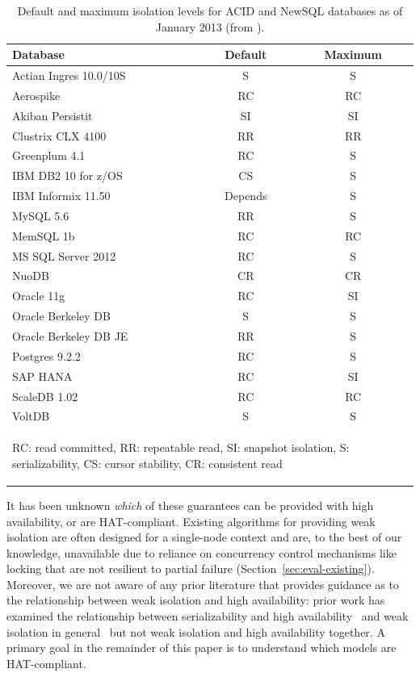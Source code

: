 \begin{table}
\begin{center}
\begin{small}
\begin{tabular}{|l|c|c|}
\hline
Database & Default & Maximum\\\hline
Actian Ingres 10.0/10S & S & S\\
Aerospike & RC & RC\\
Akiban Persistit & SI & SI\\
Clustrix CLX 4100 & RR & RR\\
Greenplum 4.1 & RC & S \\
IBM DB2 10 for z/OS & CS & S\\
IBM Informix 11.50 & Depends & S\\
MySQL 5.6 & RR & S \\
MemSQL 1b & RC & RC\\
MS SQL Server 2012 & RC & S \\
NuoDB & CR & CR\\
Oracle 11g & RC & SI\\
Oracle Berkeley DB & S & S\\
Oracle Berkeley DB JE & RR & S\\
Postgres 9.2.2 & RC & S\\
SAP HANA & RC & SI\\
ScaleDB 1.02 & RC & RC\\
VoltDB & S & S\\
\hline
\multicolumn{3}{|p{7cm}|}{{\begin{small}{RC: read committed, RR: repeatable read, SI: snapshot isolation, S: serializability, CS: cursor stability, CR: consistent read}\end{small}}}\\\hline

\end{tabular}
\caption{Default and maximum isolation levels for ACID and NewSQL
  databases as of January 2013 (from
  \protect\cite{hat-hotos}).}\vspace{-2.5em}
\label{table:existing}
\end{small}
\end{center}
\end{table}

It has been unknown \textit{which} of these guarantees can be provided
with high availability, or are HAT-compliant. Existing algorithms for
providing weak isolation are often designed for a single-node context
and are, to the best of our knowledge, unavailable due to reliance on
concurrency control mechanisms like locking that are not resilient to
partial failure (Section~\ref{sec:eval-existing}). Moreover, we are
not aware of any prior literature that provides guidance as to the
relationship between weak isolation and high availability: prior work
has examined the relationship between serializability and high
availability~\cite{davidson-survey} and weak isolation in
general~\cite{adya, ansicritique, gray-isolation} but not weak
isolation and high availability together.  A primary goal in the
remainder of this paper is to understand which models are
HAT-compliant.

